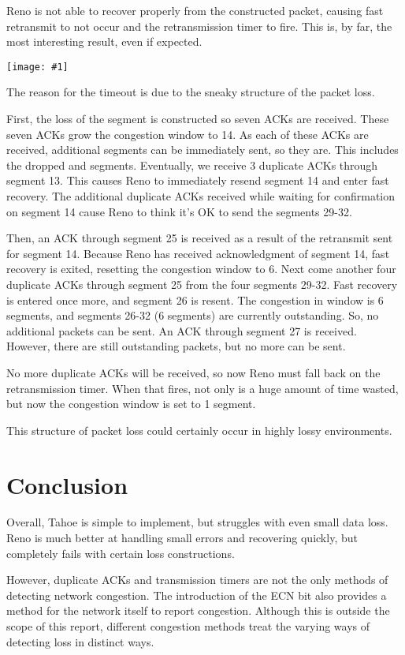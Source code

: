 \documentclass[fleqn,11pt]{article}
\newcommand{\graph}[2]{\begin{center}\texttt{[image: \#1]}\end{center}}
\newcommand{\sequence}[1]{\graph{#1/sequence}{}}
\begin{document}
Reno is not able to recover properly from the constructed packet, causing fast retransmit to not occur and the retransmission timer to fire.
This is, by far, the most interesting result, even if expected.
\sequence{reno-3}

The reason for the timeout is due to the sneaky structure of the packet loss.

First, the loss of the  segment is constructed so seven ACKs are received.
These seven ACKs grow the congestion window to 14.
As each of these ACKs are received, additional segments can be immediately sent, so they are.
This includes the dropped  and  segments.
Eventually, we receive 3 duplicate ACKs through segment 13.
This causes Reno to immediately resend segment 14 and enter fast recovery.
The additional duplicate ACKs received while waiting for confirmation on segment 14 cause Reno to think it's OK to send the segments 29-32.

Then, an ACK through segment 25 is received as a result of the retransmit sent for segment 14.
Because Reno has received acknowledgment of segment 14, fast recovery is exited, resetting the congestion window to 6.
Next come another four duplicate ACKs through segment 25 from the four segments 29-32.
Fast recovery is entered once more, and segment 26 is resent.
The congestion in window is 6 segments, and segments 26-32 (6 segments) are currently outstanding.
So, no additional packets can be sent.
An ACK through segment 27 is received.
However, there are still outstanding packets, but no more can be sent.

No more duplicate ACKs will be received, so now Reno must fall back on the retransmission timer.
When that fires, not only is a huge amount of time wasted, but now the congestion window is set to 1 segment.

This structure of packet loss could certainly occur in highly lossy environments.

\section{Conclusion}
Overall, Tahoe is simple to implement, but struggles with even small data loss.
Reno is much better at handling small errors and recovering quickly, but completely fails with certain loss constructions.

However, duplicate ACKs and transmission timers are not the only methods of detecting network congestion.
The introduction of the ECN bit also provides a method for the network itself to report congestion.
Although this is outside the scope of this report, different congestion methods treat the varying ways of detecting loss in distinct ways.
\end{document}
